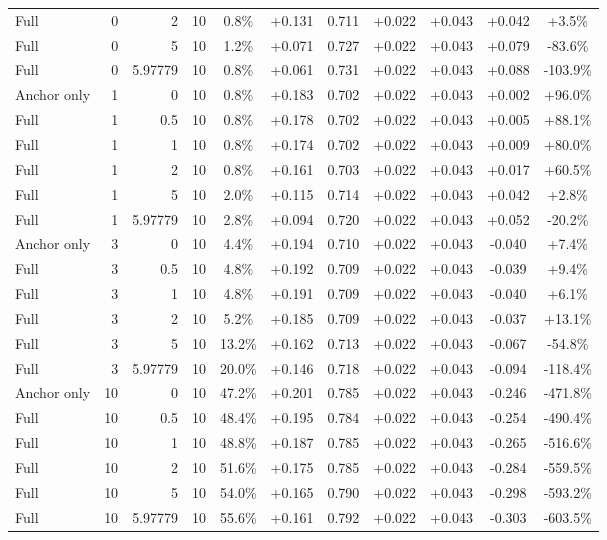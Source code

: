 \begin{table}[htbp]
\begin{tabular}{lrrrccccccc}
Full & 0 & 2 & 10 & 0.8\% & +0.131 & 0.711 & +0.022 & +0.043 & +0.042 & +3.5\% \\
Full & 0 & 5 & 10 & 1.2\% & +0.071 & 0.727 & +0.022 & +0.043 & +0.079 & -83.6\% \\
Full & 0 & 5.97779 & 10 & 0.8\% & +0.061 & 0.731 & +0.022 & +0.043 & +0.088 & -103.9\% \\
Anchor only & 1 & 0 & 10 & 0.8\% & +0.183 & 0.702 & +0.022 & +0.043 & +0.002 & +96.0\% \\
Full & 1 & 0.5 & 10 & 0.8\% & +0.178 & 0.702 & +0.022 & +0.043 & +0.005 & +88.1\% \\
Full & 1 & 1 & 10 & 0.8\% & +0.174 & 0.702 & +0.022 & +0.043 & +0.009 & +80.0\% \\
Full & 1 & 2 & 10 & 0.8\% & +0.161 & 0.703 & +0.022 & +0.043 & +0.017 & +60.5\% \\
Full & 1 & 5 & 10 & 2.0\% & +0.115 & 0.714 & +0.022 & +0.043 & +0.042 & +2.8\% \\
Full & 1 & 5.97779 & 10 & 2.8\% & +0.094 & 0.720 & +0.022 & +0.043 & +0.052 & -20.2\% \\
Anchor only & 3 & 0 & 10 & 4.4\% & +0.194 & 0.710 & +0.022 & +0.043 & -0.040 & +7.4\% \\
Full & 3 & 0.5 & 10 & 4.8\% & +0.192 & 0.709 & +0.022 & +0.043 & -0.039 & +9.4\% \\
Full & 3 & 1 & 10 & 4.8\% & +0.191 & 0.709 & +0.022 & +0.043 & -0.040 & +6.1\% \\
Full & 3 & 2 & 10 & 5.2\% & +0.185 & 0.709 & +0.022 & +0.043 & -0.037 & +13.1\% \\
Full & 3 & 5 & 10 & 13.2\% & +0.162 & 0.713 & +0.022 & +0.043 & -0.067 & -54.8\% \\
Full & 3 & 5.97779 & 10 & 20.0\% & +0.146 & 0.718 & +0.022 & +0.043 & -0.094 & -118.4\% \\
Anchor only & 10 & 0 & 10 & 47.2\% & +0.201 & 0.785 & +0.022 & +0.043 & -0.246 & -471.8\% \\
Full & 10 & 0.5 & 10 & 48.4\% & +0.195 & 0.784 & +0.022 & +0.043 & -0.254 & -490.4\% \\
Full & 10 & 1 & 10 & 48.8\% & +0.187 & 0.785 & +0.022 & +0.043 & -0.265 & -516.6\% \\
Full & 10 & 2 & 10 & 51.6\% & +0.175 & 0.785 & +0.022 & +0.043 & -0.284 & -559.5\% \\
Full & 10 & 5 & 10 & 54.0\% & +0.165 & 0.790 & +0.022 & +0.043 & -0.298 & -593.2\% \\
Full & 10 & 5.97779 & 10 & 55.6\% & +0.161 & 0.792 & +0.022 & +0.043 & -0.303 & -603.5\% \\

\end{tabular}
\end{table}
